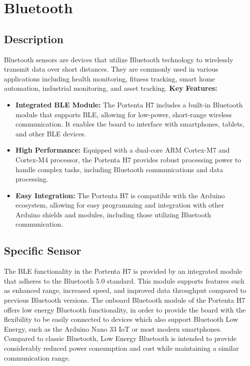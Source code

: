\chapter{Bluetooth}

\section{Description}

Bluetooth sensors are devices that utilize Bluetooth technology to wirelessly transmit data over short distances. They are commonly used in various applications including health monitoring, fitness tracking, smart home automation, industrial monitoring, and asset tracking. \cite{bluetoothPortentaH7:2024}
\newline
\textbf{Key Features:} \newline
\begin{itemize}

\item \textbf{Integrated BLE Module:} The Portenta H7 includes a built-in Bluetooth module that supports BLE, allowing for low-power, short-range wireless communication. It enables the board to interface with smartphones, tablets, and other BLE devices. 

\item \textbf{High Performance:} Equipped with a dual-core ARM Cortex-M7 and Cortex-M4 processor, the Portenta H7 provides robust processing power to handle complex tasks, including Bluetooth communications and data processing. 

\item \textbf{Easy Integration:} The Portenta H7 is compatible with the Arduino ecosystem, allowing for easy programming and integration with other Arduino shields and modules, including those utilizing Bluetooth communication. \cite{bluetoothPortentaH7:2024}

\end{itemize}

\section{Specific Sensor}
The BLE functionality in the Portenta H7 is provided by an integrated module that adheres to the Bluetooth 5.0 standard. This module supports features such as enhanced range, increased speed, and improved data throughput compared to previous Bluetooth versions.
\newline
The onboard Bluetooth module of the Portenta H7 offers low energy Bluetooth functionality, in order to provide the board with the flexibility to be easily connected to devices which also support Bluetooth Low Energy, such as the Arduino Nano 33 IoT or most modern smartphones. Compared to classic Bluetooth, Low Energy Bluetooth is intended to provide considerably reduced power consumption and cost while maintaining a similar communication range. \cite{bluetoothPortentaH7:2024}

